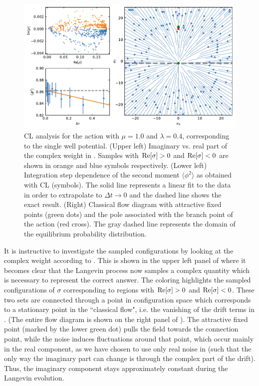 \documentclass[../main.tex]{subfiles}
\begin{document}
 \begin{figure}[t]
   \centering
   \includegraphics[width=\columnwidth]{./3mathunderpinnings/complex_plot.pdf}
   \caption{\label{fig:cl_stepsize}
   CL analysis for the action  with $\mu = 1.0$ and $\lambda = 0.4$, corresponding to the single well potential.
   (Upper left) Imaginary vs. real part of the complex weight in . Samples with ${\rm Re}[\sigma] > 0 $ and ${\rm Re}[\sigma] < 0$ are shown in orange and blue symbols respectively.
  (Lower left) Integration step dependence of the second moment $\langle \phi^2 \rangle$ as obtained with CL (symbols). The solid line represents a linear fit to the data in order to extrapolate to $\Delta t\to 0$ and the dashed line shows the exact result.
   (Right) Classical flow diagram with attractive fixed points (green dots) and the pole associated with the branch point of the action (red cross). The gray dashed line represents the domain of the equilibrium probability distribution.}
 \end{figure}

 It is instructive to investigate the sampled configurations by looking at the complex weight according to . This is shown in the upper left panel of  where it becomes clear that the Langevin process now samples a complex quantity which is necessary to represent the correct answer. The coloring highlights the sampled configurations of $\sigma$ corresponding to regions with ${\rm Re}[\sigma] > 0 $ and ${\rm Re}[\sigma] < 0$.
 These two sets are connected through a point in configuration space which corresponds to a stationary point in the ``classical flow", i.e. the vanishing of the drift terms in . {(The entire flow diagram is shown on the right panel of }). The attractive fixed point (marked by the lower green dot) pulls the field towards the connection point, while the noise induces fluctuations around that point, which occur mainly in the real component, as we have chosen to use only real noise in  (such that the only way the imaginary part can change is through the complex part of the drift). Thus, the imaginary component stays approximately constant during the Langevin evolution.
\end{document}
